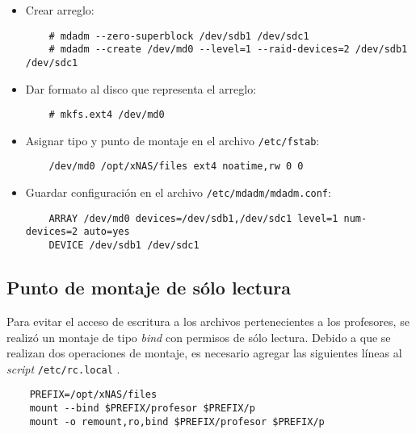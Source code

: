 \begin{itemize}
\begin{itemize}
    \end{itemize}
  \item Crear arreglo:

{
\scriptsize
\linespread{1}
\begin{verbatim}
    # mdadm --zero-superblock /dev/sdb1 /dev/sdc1
    # mdadm --create /dev/md0 --level=1 --raid-devices=2 /dev/sdb1 /dev/sdc1
\end{verbatim}
}

  \item Dar formato al disco que representa el arreglo:

{
\scriptsize
\linespread{1}
\begin{verbatim}
    # mkfs.ext4 /dev/md0
\end{verbatim}
}

  \item Asignar tipo y punto de montaje en el archivo \texttt{/etc/fstab}:

{
\scriptsize
\linespread{1}
\begin{verbatim}
    /dev/md0 /opt/xNAS/files ext4 noatime,rw 0 0
\end{verbatim}
}

  \item Guardar configuraci\'{o}n en el archivo \texttt{/etc/mdadm/mdadm.conf}:

{
\scriptsize
\linespread{1}
\begin{verbatim}
    ARRAY /dev/md0 devices=/dev/sdb1,/dev/sdc1 level=1 num-devices=2 auto=yes
    DEVICE /dev/sdb1 /dev/sdc1
\end{verbatim}
}

\end{itemize}

      \subsection {Punto de montaje de s\'{o}lo lectura}

Para evitar el acceso de escritura a los archivos pertenecientes a los profesores, se realiz\'{o} un montaje de tipo \textit{bind} con permisos de s\'{o}lo lectura. Debido a que se realizan dos operaciones de montaje, es necesario agregar las siguientes l\'{i}neas al \emph{\gls{script}} \texttt{/etc/rc.local} \cite{_mount_????} \cite{_read-only_????} \cite{_karel_????}.

{
\scriptsize
\linespread{1}
\begin{verbatim}
	PREFIX=/opt/xNAS/files
	mount --bind $PREFIX/profesor $PREFIX/p
	mount -o remount,ro,bind $PREFIX/profesor $PREFIX/p
\end{verbatim}
}

